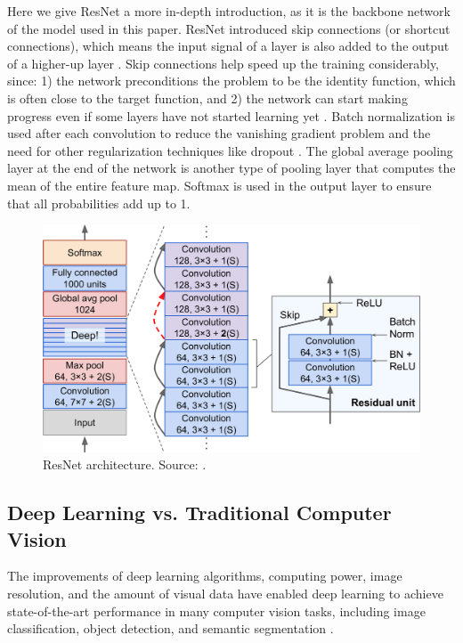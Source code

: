 \documentclass[a4paper, 11pt, oneside]{article}
\begin{document}
Here we give ResNet a more in-depth introduction, as it is the backbone network of the model used in this paper.
ResNet introduced skip connections (or shortcut connections), which means the input signal of a layer is also added to the
output of a higher-up layer \cite{geron2019hands, he2016deep}. Skip connections help speed up the training considerably,
since: 1) the network preconditions the problem to be the identity function, which is often close to the target function,
and 2) the network can start making progress even if some layers have not started learning yet
\cite{geron2019hands, he2016deep}. Batch normalization \cite{ioffe2015batch} is used after each convolution
to reduce the vanishing gradient problem \cite{hochreiter1998vanishing} and the need for other regularization techniques
like dropout \cite{srivastava2014dropout}. The global average pooling layer at the end of the network is another type of
pooling layer that computes the mean of the entire feature map. Softmax is used in the output layer to ensure that all
probabilities add up to 1.

\begin{figure}[ht]
  \begin{center}
    \includegraphics[width=.8\textwidth]{resnet.png}
  \end{center}
  \caption{ResNet architecture. Source: \cite{geron2019hands}.}
\end{figure}

\subsection{Deep Learning vs. Traditional Computer Vision}

\label{sec:dlvscv}

The improvements of deep learning algorithms, computing power, image resolution, and the amount of visual data have
enabled deep learning to achieve state-of-the-art performance in many computer vision tasks, including image
classification, object detection, and semantic segmentation \cite{qin2015underwater, voulodimos2018deep, o2019deep}.
\end{document}
